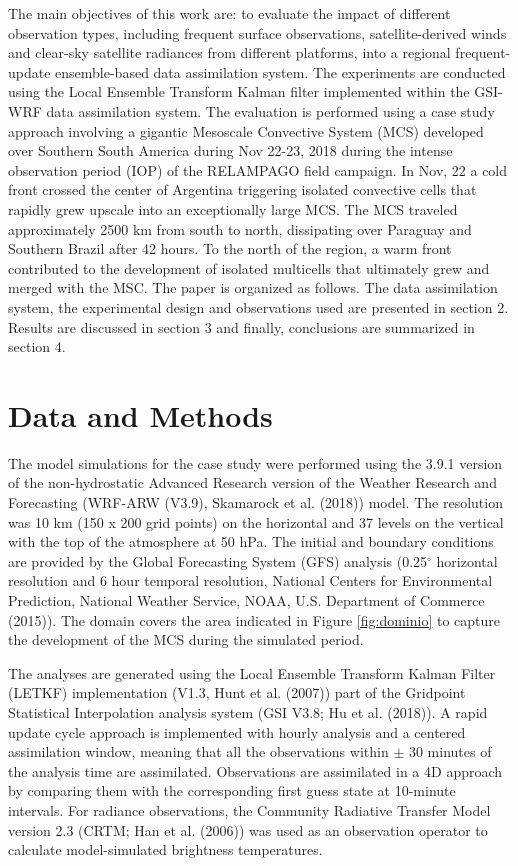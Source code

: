 \documentclass[final,5p,times,twocolumn,authoryear]{elsarticle} %
\begin{document}
The main objectives of this work are: to evaluate the impact of different observation types, including frequent surface observations, satellite-derived winds and clear-sky satellite radiances from different platforms, into a regional frequent-update ensemble-based data assimilation system.
The experiments are conducted using the Local Ensemble Transform Kalman filter implemented within the GSI-WRF data assimilation system.
The evaluation is performed using a case study approach involving a gigantic Mesoscale Convective System (MCS) developed over Southern South America during Nov 22-23, 2018 during the intense observation period (IOP) of the RELAMPAGO field campaign.
In Nov, 22 a cold front crossed the center of Argentina triggering isolated convective cells that rapidly grew upscale into an exceptionally large MCS.
The MCS traveled approximately 2500 km from south to north, dissipating over Paraguay and Southern Brazil after 42 hours.
To the north of the region, a warm front contributed to the development of isolated multicells that ultimately grew and merged with the MSC.
The paper is organized as follows. The data assimilation system, the experimental design and observations used are presented in section 2. Results are discussed in section 3 and finally, conclusions are summarized in section 4.

\hypertarget{data-and-methods}{%
\section{Data and Methods}\label{data-and-methods}}

The model simulations for the case study were performed using the 3.9.1 version of the non-hydrostatic Advanced Research version of the Weather Research and Forecasting (WRF-ARW (V3.9), Skamarock et al. (2018)) model.
The resolution was 10 km (150 x 200 grid points) on the horizontal and 37 levels on the vertical with the top of the atmosphere at 50 hPa.
The initial and boundary conditions are provided by the Global Forecasting System (GFS) analysis (0.25\(^{\circ}\) horizontal resolution and 6 hour temporal resolution, National Centers for Environmental Prediction, National Weather Service, NOAA, U.S. Department of Commerce (2015)).
The domain covers the area indicated in Figure \ref{fig:dominio} to capture the development of the MCS during the simulated period.

The analyses are generated using the Local Ensemble Transform Kalman Filter (LETKF) implementation (V1.3, Hunt et al. (2007)) part of the Gridpoint Statistical Interpolation analysis system (GSI V3.8; Hu et al. (2018)).
A rapid update cycle approach is implemented with hourly analysis and a centered assimilation window, meaning that all the observations within \(\pm\) 30 minutes of the analysis time are assimilated.
Observations are assimilated in a 4D approach by comparing them with the corresponding first guess state at 10-minute intervals.
For radiance observations, the Community Radiative Transfer Model version 2.3 (CRTM; Han et al. (2006)) was used as an observation operator to calculate model-simulated brightness temperatures.
\end{document}
